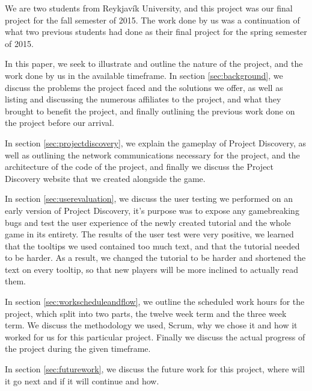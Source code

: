 We are two students from Reykjavík University, and this project was our final project for the fall semester of 2015. The work done by us was a continuation of what two previous students had done as their final project for the spring semester of 2015. 

In this paper, we seek to illustrate and outline the nature of the project, and the work done by us in the available timeframe. In section \ref{sec:background}, we discuss the problems the project faced and the solutions we offer, as well as listing and discussing the numerous affiliates to the project, and what they brought to benefit the project, and finally outlining the previous work done on the project before our arrival. 

In section \ref{sec:projectdiscovery}, we explain the gameplay of Project Discovery, as well as outlining the network communications necessary for the project, and the architecture of the code of the project, and finally we discuss the Project Discovery website that we created alongside the game. 

In section \ref{sec:userevaluation}, we discuss the user testing we performed on an early version of Project Discovery, it's purpose was to expose any gamebreaking bugs and test the user experience of the newly created tutorial and the whole game in its entirety. The results of the user test were very positive, we learned that the tooltips we used contained too much text, and that the tutorial needed to be harder. As a result, we changed the tutorial to be harder and shortened the text on every tooltip, so that new players will be more inclined to actually read them.

In section \ref{sec:workscheduleandflow}, we outline the scheduled work hours for the project, which split into two parts, the twelve week term and the three week term. We discuss the methodology we used, Scrum, why we chose it and how it worked for us for this particular project. Finally we discuss the actual progress of the project during the given timeframe.

In section \ref{sec:futurework}, we discuss the future work for this project, where will it go next and if it will continue and how.

